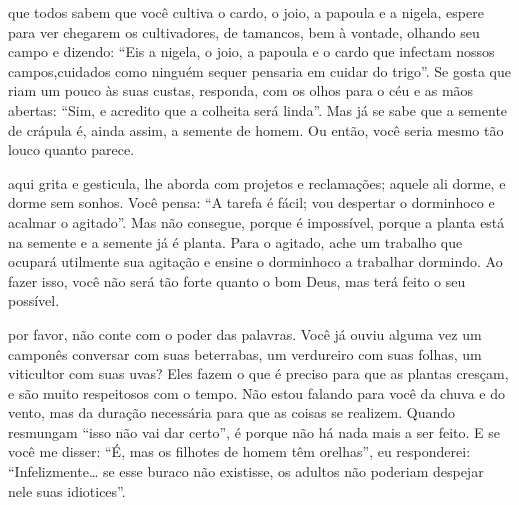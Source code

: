 \bigskip

 que todos sabem que você cultiva o cardo, o joio, a papoula e a
nigela, espere para ver chegarem os cultivadores, de tamancos, bem à
vontade, olhando seu campo e dizendo: ``Eis a nigela, o joio, a papoula
e o cardo que infectam nossos campos,cuidados como ninguém sequer
pensaria em cuidar do trigo''. Se gosta que riam um pouco às suas
custas, responda, com os olhos para o céu e as mãos abertas: ``Sim, e
acredito que a colheita será linda''. Mas já se sabe que a semente de
crápula é, ainda assim, a semente de homem. Ou então, você seria mesmo
tão louco quanto parece. \enlargethispage{\baselineskip}

\bigskip
\bigskip

 aqui grita e gesticula, lhe aborda com projetos e reclamações;
aquele ali dorme, e dorme sem sonhos. Você pensa: ``A tarefa é fácil;
vou despertar o dorminhoco e acalmar o agitado''. Mas não consegue,
porque é impossível, porque a planta está na semente e a semente já é
planta. Para o agitado, ache um trabalho que ocupará utilmente sua
agitação e ensine o dorminhoco a trabalhar dormindo. Ao fazer isso, você
não será tão forte quanto o bom Deus, mas terá feito o seu possível.

\bigskip
\bigskip

 por favor, não conte com o poder das palavras. Você já ouviu alguma
vez um camponês conversar com suas beterrabas, um verdureiro com suas
folhas, um viticultor com suas uvas? Eles fazem o que é preciso para que
as plantas cresçam, e são muito respeitosos com o tempo. Não estou
falando para você da chuva e do vento, mas da duração necessária para
que as coisas se realizem. Quando resmungam ``isso não vai dar certo'',
é porque não há nada mais a ser feito. E se você me disser: ``É, mas os
filhotes de homem têm orelhas'', eu responderei: ``Infelizmente\ldots{} se
esse buraco não existisse, os adultos não poderiam despejar nele suas
idiotices''.

\bigskip
\bigskip

\pagebreak
\thispagestyle{empty}

